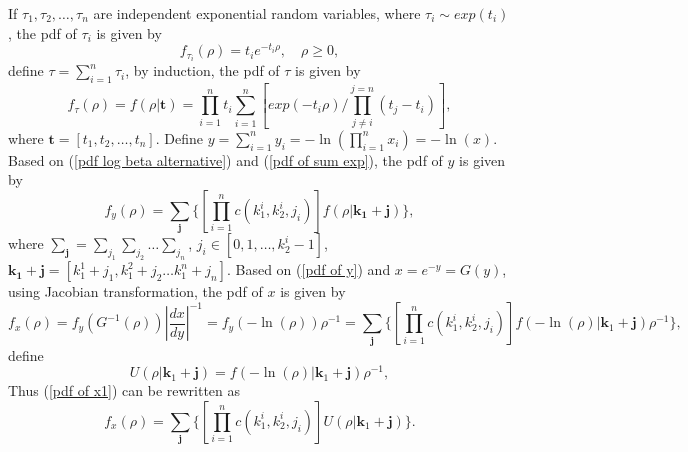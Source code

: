 \documentclass[12pt, draftclsnofoot, onecolumn]{IEEEtran}
\begin{document}
If $\tau_{1}, \tau_{2}, \ldots, \tau_{n}$ are independent exponential random variables, where $\tau_{i}\sim exp(t_{i})$, the pdf of $\tau_{i}$ is given by 
\begin{equation}
f_{\tau_{i}}(\rho)=t_{i}e^{-t_{i}\rho}, \quad\rho\geq 0, 
\label{pdf exp}
\end{equation}
define $\tau=\sum_{i=1}^{n}\tau_{i}$, by induction, the pdf of $\tau$ is given by\cite{bhargava1981distribution}
\begin{equation}
f_{\tau}(\rho)=f(\rho|\mathbf{t})=\prod_{i=1}^{n}t_{i}\sum_{i=1}^{n}[exp(-t_{i}\rho)/\prod_{j\neq i}^{j=n}(t_{j}-t_{i})],
\label{pdf of sum exp}
\end{equation}
where $\mathbf{t}=[t_{1}, t_{2}, \ldots, t_{n}]$. Define $y=\sum_{i=1}^{n}y_{i}=-\ln(\prod_{i=1}^{n}x_{i})=-\ln(x)$. Based on (\ref{pdf log beta alternative}) and (\ref{pdf of sum exp}), the pdf of $y$ is given by\cite{bhargava1981distribution}
\begin{equation}
f_{y}(\rho)=\sum_{\mathbf{j}}\{[\prod_{i=1}^{n}c(k_{1}^{i},k_{2}^{i}, j_{i})]f(\rho|\mathbf{k_{1}}+\mathbf{j})\},
\label{pdf of y}
\end{equation}
where $\sum_{\mathbf{j}}=\sum_{j_{1}}\sum_{j_{2}}\ldots \sum_{j_{n}}$, $j_{i}\in [0,1,\ldots, k^{i}_{2}-1]$, $\mathbf{k_{1}}+\mathbf{j}=[k_{1}^{1}+j_{1}, k_{1}^{2}+j_{2} \ldots k_{1}^{n}+j_{n}]$. Based on (\ref{pdf of y}) and $x=e^{-y}=G(y)$, using Jacobian transformation, the pdf of $x$ is given by
\begin{equation}
f_{x}(\rho)=f_{y}(G^{-1}(\rho))|\frac{dx}{dy}|^{-1}=f_{y}(-\ln(\rho))\rho^{-1}=\sum_{\mathbf{j}}\{[\prod_{i=1}^{n}c(k_{1}^{i},k_{2}^{i}, j_{i})]f(-\ln(\rho)|\mathbf{k}_{1}+\mathbf{j})\rho^{-1}\},
\label{pdf of x1}
\end{equation} 
define 
\begin{equation}
U(\rho|\mathbf{k}_{1}+\mathbf{j})=f(-\ln(\rho)|\mathbf{k}_{1}+\mathbf{j})\rho^{-1},
\label{definition of U}
\end{equation}
Thus (\ref{pdf of x1}) can be rewritten as 
\begin{equation}
f_{x}(\rho)=\sum_{\mathbf{j}}\{[\prod_{i=1}^{n}c(k_{1}^{i},k_{2}^{i}, j_{i})]U(\rho|\mathbf{k}_{1}+\mathbf{j})\}.
\label{final pdf of x}
\end{equation}
\end{document}
